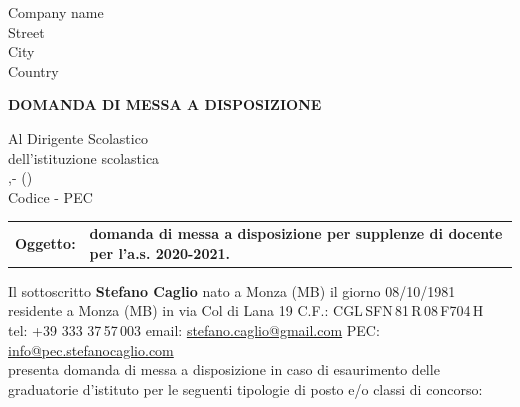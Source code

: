 \begin{letter}{Company name \\ Street\\ City\\ Country}

\begin{center}
\large \bf
DOMANDA DI MESSA A DISPOSIZIONE
\vspace{5 mm}
\end{center}

\normalsize

\begin{flushright}
Al Dirigente Scolastico \\
dell'istituzione scolastica \textbf{\Denominazione} \\
\Indirizzo,\space\Civico\space - \CAP\space\Comune\space (\Provincia) \\
Codice \Codice\space - PEC \href{mailto:\IndirizzoPECAutonomia}{\IndirizzoPECAutonomia} \\
\end{flushright}

\vspace{7 mm}

\begin{tabularx}{\textwidth}{>{\bfseries} lX }
Oggetto: & \textbf{domanda di messa a disposizione per supplenze di docente per l’a.s. 2020-2021.}
\end{tabularx}

\vspace{7 mm}

Il sottoscritto \textbf{Stefano Caglio} \hfill nato a Monza (MB) \hfill il giorno 08/10/1981 \\
residente a \hfill Monza (MB) \hfill in via Col di Lana 19\hspace{10 mm} C.F.: CGL\,SFN\,81\,R\,08\,F704\,H \\
tel: +39 333 37\,57\,003 \hfill email: \href{mailto:stefano.caglio@gmail.com}{stefano.caglio@gmail.com} \hfill PEC: \href{mailto:info@pec.stefanocaglio.com}{info@pec.stefanocaglio.com} \\

presenta domanda di messa a disposizione in caso di esaurimento delle graduatorie d'istituto per le seguenti tipologie di posto e/o classi di concorso:


\end{letter}
